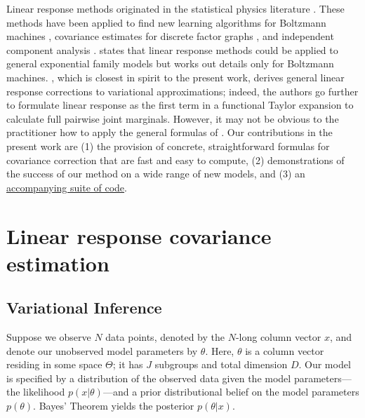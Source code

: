 \documentclass{article}\usepackage[]{graphicx}\usepackage[]{color}
\theoremstyle{plain}
\begin{document}
Linear response methods originated in the statistical physics literature
\citep{opper:2001:advancedmeanfield, tanaka:2000:information,
kappen:1998:efficient, opper:2003:variational}. These methods have been applied
to find new learning algorithms for Boltzmann machines
\citep{kappen:1998:efficient}, covariance estimates for discrete factor graphs
\citep{welling:2004:linear}, and independent component analysis
\citep{hojen:2002:mean}. \citep{tanaka:1998:mean} states that linear response
methods could be applied to general exponential family models but works out
details only for Boltzmann machines. \citep{opper:2003:variational}, which is
closest in spirit to the present work, derives general linear response
corrections to variational approximations; indeed, the authors go further to
formulate linear response as the first term in a functional Taylor expansion to
calculate full pairwise joint marginals. However, it may not be obvious to the
practitioner how to apply the general formulas of \citep{opper:2003:variational}.
Our contributions in the present work are (1) the provision of concrete,
straightforward formulas for covariance correction that are fast and easy to
compute, (2) demonstrations of the success of our method on a wide range of new
models, and (3) an
\href{https://github.com/rgiordan/LinearResponseVariationalBayesNIPS2015}{accompanying suite of code}.

\section{Linear response covariance estimation} \label{sec:lr}

\subsection{Variational Inference}

Suppose we observe $N$ data points, denoted by the $N$-long column vector $x$,
and denote our unobserved model parameters by $\theta$. Here, $\theta$ is a
column vector residing in some space $\Theta$; it has $J$ subgroups and total
dimension $D$. Our model is specified by a distribution of the observed data
given the model parameters---the likelihood $p(x | \theta)$---and a prior
distributional belief on the model parameters $p(\theta)$. Bayes' Theorem yields
the posterior $p(\theta | x)$.
\end{document}
